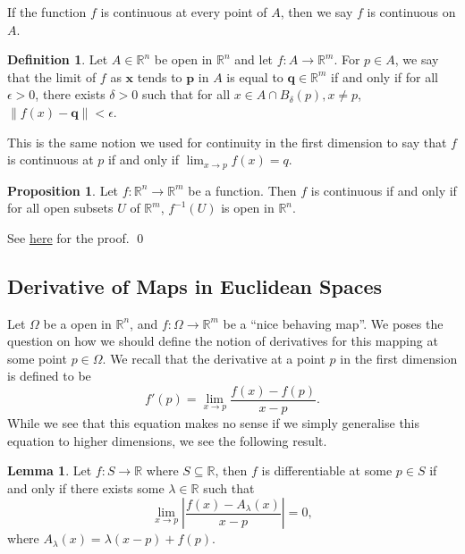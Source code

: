 \documentclass[
]{article}
\theoremstyle{definition}
\newtheorem{prop}{Proposition}
\theoremstyle{definition}
\newtheorem{definition}{Definition}[section]
\newtheorem{lemma}{Lemma}[section]
\begin{document}
If the function \(f\) is continuous at every point of \(A\), then we say
\(f\) is continuous on \(A\).

\begin{definition}
  Let \(A \in \mathbb{R}^n\) be open in \(\mathbb{R}^n\) and let 
  \(f : A \to \mathbb{R}^m\). For \(p \in A\), we say that the limit of \(f\) as 
  \(\mathbf{x}\) tends to \(\mathbf{p}\) in \(A\) is equal to 
  \(\mathbf{q} \in \mathbb{R}^m\) if and only if for all \(\epsilon > 0\), there 
  exists \(\delta > 0\) such that for all \(x \in A \cap B_\delta(p), x \neq p\),
  \(\|f(x) - \mathbf{q}\| < \epsilon\).
\end{definition}

This is the same notion we used for continuity in the first dimension to
say that \(f\) is continuous at \(p\) if and only if
\(\lim_{x \to p} f(x) = q\).

\begin{prop}
  Let \(f : \mathbb{R}^n \to \mathbb{R}^m\) be a function. Then \(f\) is 
  continuous if and only if for all open subsets \(U\) of \(\mathbb{R}^m\), 
  \(f^{-1}(U)\) is open in \(\mathbb{R}^n\).
\end{prop}
\proof

See
\href{https://github.com/JasonKYi/learn_mspaces/blob/master/src/metric_spaces/basic.lean\#L257}{here}
for the proof. \qed

\hypertarget{derivative-of-maps-in-euclidean-spaces}{%
\subsection{Derivative of Maps in Euclidean
Spaces}\label{derivative-of-maps-in-euclidean-spaces}}

Let \(\Omega\) be a open in \(\mathbb{R}^n\), and
\(f : \Omega \to \mathbb{R}^m\) be a ``nice behaving map''. We poses the
question on how we should define the notion of derivatives for this
mapping at some point \(p \in \Omega\). We recall that the derivative at
a point \(p\) in the first dimension is defined to be
\[f'(p) = \lim_{x \to p}\frac{f(x) - f(p)}{x - p}.\] While we see that
this equation makes no sense if we simply generalise this equation to
higher dimensions, we see the following result.

\begin{lemma}
  Let \(f : S \to \mathbb{R}\) where \(S \subseteq \mathbb{R}\), then \(f\) is 
  differentiable at some \(p \in S\) if and only if there exists some 
  \(\lambda \in \mathbb{R}\) such that 
  \[\lim_{x \to p} \left|\frac{f(x) - A_\lambda(x)}{x - p}\right| = 0,\]
  where \(A_\lambda(x) = \lambda(x - p) + f(p)\).
\end{lemma}
\proof
\end{document}
